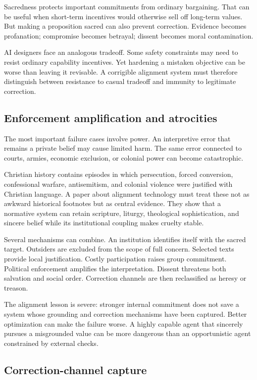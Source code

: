 \documentclass[11pt]{article}
\begin{document}
Sacredness protects important commitments from ordinary bargaining. That can be useful when short-term incentives would otherwise sell off long-term values. But making a proposition sacred can also prevent correction. Evidence becomes profanation; compromise becomes betrayal; dissent becomes moral contamination.

AI designers face an analogous tradeoff. Some safety constraints may need to resist ordinary capability incentives. Yet hardening a mistaken objective can be worse than leaving it revisable. A corrigible alignment system must therefore distinguish between resistance to casual tradeoff and immunity to legitimate correction.

\subsection{Enforcement amplification and atrocities}

The most important failure cases involve power. An interpretive error that remains a private belief may cause limited harm. The same error connected to courts, armies, economic exclusion, or colonial power can become catastrophic.

Christian history contains episodes in which persecution, forced conversion, confessional warfare, antisemitism, and colonial violence were justified with Christian language. A paper about alignment technology must treat these not as awkward historical footnotes but as central evidence. They show that a normative system can retain scripture, liturgy, theological sophistication, and sincere belief while its institutional coupling makes cruelty stable.

Several mechanisms can combine. An institution identifies itself with the sacred target. Outsiders are excluded from the scope of full concern. Selected texts provide local justification. Costly participation raises group commitment. Political enforcement amplifies the interpretation. Dissent threatens both salvation and social order. Correction channels are then reclassified as heresy or treason.

The alignment lesson is severe: stronger internal commitment does not save a system whose grounding and correction mechanisms have been captured. Better optimization can make the failure worse. A highly capable agent that sincerely pursues a misgrounded value can be more dangerous than an opportunistic agent constrained by external checks.

\subsection{Correction-channel capture}
\end{document}
